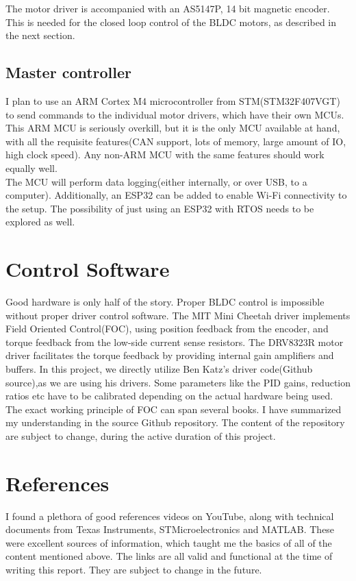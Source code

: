 \documentclass[a4paper]{article}
\begin{document}
			The motor driver is accompanied with an AS5147P, 14 bit magnetic encoder. This is needed for the closed loop control of the BLDC motors, as described in the next section.
		\subsection{Master controller}
			I plan to use an ARM Cortex M4 microcontroller from STM(STM32F407VGT) to send commands to the individual motor drivers, which have their own MCUs. This ARM MCU is seriously overkill, but it is the only MCU available at hand, with all the requisite features(CAN support, lots of memory, large amount of IO, high clock speed). Any non-ARM MCU with the same features should work equally well.\\

			The MCU will perform data logging(either internally, or over USB, to a computer). Additionally, an ESP32 can be added to enable Wi-Fi connectivity to the setup. The possibility of just using an ESP32 with RTOS needs to be explored as well.

	\section{Control Software}
		Good hardware is only half of the story. Proper BLDC control is impossible without proper driver control software. The MIT Mini Cheetah driver implements Field Oriented Control(FOC), using position feedback from the encoder, and torque feedback from the low-side current sense resistors. The DRV8323R motor driver facilitates the torque feedback by providing internal gain amplifiers and buffers. In this project, we directly utilize Ben Katz's driver code(Github source),as we are using his drivers. Some parameters like the PID gains, reduction ratios etc have to be calibrated depending on the actual hardware being used.\\

		The exact working principle of FOC can span several books. I have summarized my understanding in the source Github repository. The content of the repository are subject to change, during the active duration of this project.

	\pagebreak
	\section{References}
		I found a plethora of good references videos on YouTube, along with technical documents from Texas Instruments, STMicroelectronics and MATLAB. These were excellent sources of information, which taught me the basics of all of the content mentioned above. The links are all valid and functional at the time of writing this report. They are subject to change in the future.
\end{document}
